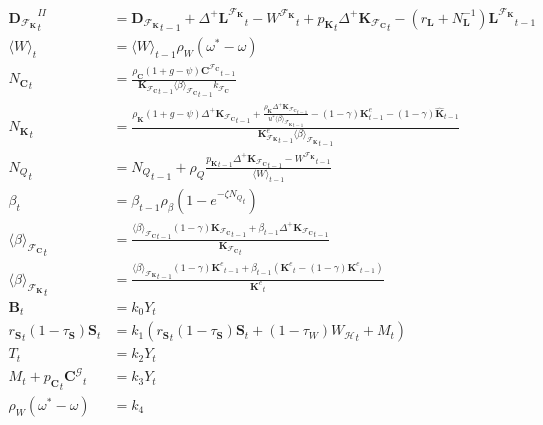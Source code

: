\documentclass[a4paper, headings=standardclasses]{scrartcl}
\numberwithin{equation}{subsection}
\begin{document}
{\begin{align}
		{\mathbf{D}_{\mathcal{F}_\mathbf{K}}}^{II}_t           & = {\mathbf{D}_{\mathcal{F}_\mathbf{K}}}_{t-1} + {\Delta^+{\mathbf{L}^{\mathcal{F}_\mathbf{K}}}}_t - {W^{\mathcal{F}_\mathbf{K}}}_t +  {p_{\mathbf{K}}}_t {\Delta^+{\mathbf{K}_{\mathcal{F}_\mathbf{C}}}}_t - (r_\mathbf{L} + N_\mathbf{L}^{-1}) {\mathbf{L}^{\mathcal{F}_\mathbf{K}}}_{t-1} \\
		\langle W \rangle_t & = \langle W \rangle_{t-1} \rho_W (\omega^* - \omega) \\
		{N_\mathbf{C}}_t & = \frac{\rho_\mathbf{C} (1 + g - \psi) {\mathbf{C}^{\mathcal{F}_\mathbf{C}}}_{t-1}}{{\mathbf{K}_{\mathcal{F}_\mathbf{C}}}_{t-1} {\langle \beta \rangle_{\mathcal{F}_\mathbf{C}}}_{t-1} k_{\mathcal{F}_\mathbf{C}}}\\
		{N_\mathbf{K}}_t & = \frac{\rho_\mathbf{K} (1 + g - \psi){\Delta^+\mathbf{K}_{\mathcal{F}_\mathbf{C}}}_{t-1} + \frac{\rho_\mathbf{K} {\Delta^+\mathbf{K}_{\mathcal{F}_\mathbf{C}}}_{t-1}}{u^* {\langle \beta \rangle_{\mathcal{F}_\mathbf{K}}}_{t-1}} - (1-\gamma) \mathbf{K}^e_{t-1} - (1-\gamma)\hat{\mathbf{K}}_{t-1}}{{\mathbf{K}_{\mathcal{F}_\mathbf{K}}^e}_{t-1} {\langle \beta \rangle_{\mathcal{F}_\mathbf{K}}}_{t-1}}\\
		{N_Q}_t & = {N_Q}_{t-1} + \rho_Q \frac{{p_\mathbf{K}}_{t-1} {\Delta^+ \mathbf{K}_{\mathcal{F}_\mathbf{C}}}_{t-1} - {W^{\mathcal{F}_\mathbf{K}}}_{t-1}}{\langle W \rangle_{t-1}}\\
		\beta_t & = \beta_{t-1} \rho_\beta (1-e^{-\zeta {N_Q}_t}) \\
		{\langle\beta\rangle_{\mathcal{F}_\mathbf{C}}}_{t} & =  \frac{{\langle\beta\rangle_{\mathcal{F}_\mathbf{C}}}_{t-1} (1 - \gamma) {\mathbf{K}_{\mathcal{F}_\mathbf{C}}}_{t-1} + \beta_{t-1} {\Delta^+ \mathbf{K}_{\mathcal{F}_\mathbf{C}}}_{t-1}}{{\mathbf{K}_{\mathcal{F}_\mathbf{C}}}_{t}} \\
		{\langle\beta\rangle_{\mathcal{F}_\mathbf{K}}}_{t} & = \frac{{\langle\beta\rangle_{\mathcal{F}_\mathbf{K}}}_{t-1} (1 - \gamma) {\mathbf{K}^e}_{t-1} + \beta_{t-1} ({\mathbf{K}^e}_{t} - (1 - \gamma) {\mathbf{K}^e}_{t-1})}{{\mathbf{K}^e}_{t}} \\
		\mathbf{B}_t &= k_0 Y_t \\
		{r_\mathbf{S}}_t (1 - \tau_\mathbf{S}) \mathbf{S}_t &= k_1 ({r_\mathbf{S}}_t (1 - \tau_\mathbf{S}) \mathbf{S}_t + (1 - \tau_W) {W_\mathcal{H}}_t + M_t)\\
		T_t &= k_2 Y_t \\
		M_t + {p_\mathbf{C}}_t {\mathbf{C}^\mathcal{G}}_t &= k_3 Y_t \\
		\rho_W (\omega^* - \omega) &= k_4	
	\end{align}
}
\end{document}
